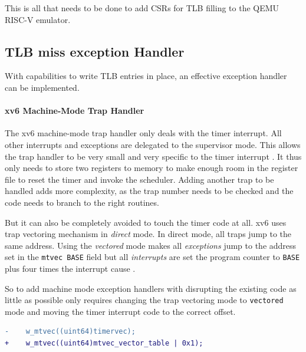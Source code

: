 This is all that needs to be done to add CSRs for TLB filling to the QEMU RISC-V emulator.




\subsection{TLB miss exception Handler}
With capabilities to write TLB entries in place, an effective exception handler can be implemented.

\paragraph{xv6 Machine-Mode Trap Handler} The xv6 machine-mode trap handler only deals
with the timer interrupt. All other interrupts and exceptions are delegated to the supervisor
mode. This allows the trap handler to be very small and very specific to the timer interrupt \cite{cox2011xv6}.
It thus only needs to store two registers to memory to make enough room in the register file
to reset the timer and invoke the scheduler.
Adding another trap to be handled adds more complexity, as the trap number needs to be checked
and the code needs to branch to the right routines.

But it can also be completely avoided to touch the timer code at all. xv6 uses trap vectoring
mechanism in \textit{direct} mode. In direct mode, all traps jump to the same address.
Using the \textit{vectored} mode makes all \textit{exceptions} jump to the address set
in the \texttt{mtvec BASE} field but all \textit{interrupts} are set the program counter
to \texttt{BASE} plus four times the interrupt cause \cite{RISCVInstructionSet}.

So to add machine mode exception handlers with disrupting the existing code as little as possible only
requires changing the trap vectoring mode to \texttt{vectored} mode and moving the timer interrupt code
to the correct offset.

\begin{lstlisting}[language=diff]
-    w_mtvec((uint64)timervec);
+    w_mtvec((uint64)mtvec_vector_table | 0x1);
\end{lstlisting}

